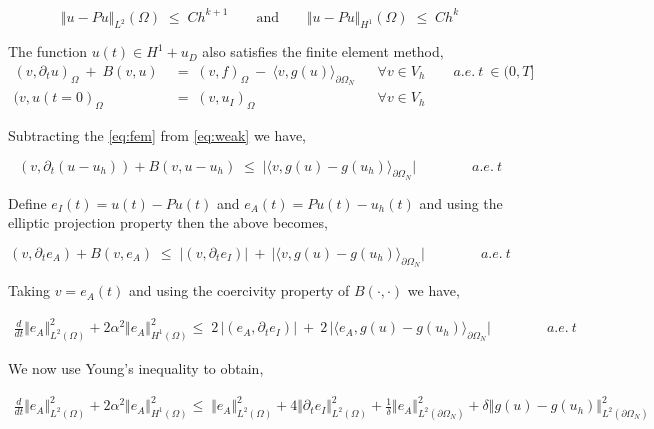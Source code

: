 \documentclass[10pt]{report}
\numberwithin{equation}{section}
\begin{document}
\begin{equation}
\Vert u - Pu \Vert_{L^{2}}(\Omega) \; \leq \; Ch^{k+1}  \qquad \text{and} \qquad 
\Vert u - Pu \Vert_{H^{1}}(\Omega) \; \leq \; Ch^{k} \label{eq:ApproxProp}
\end{equation}



The function $u(t) \in H^{1} + u_{D}$ also satisfies the finite element method, 
\begin{align}
(v,\partial_{t} u)_{\Omega} \ + \ B(v,u) \; &= \; (v,f)_{\Omega} \ - \ \langle v, g(u) \rangle_{\partial \Omega_{N}} && \forall v \in V_{h} \qquad a.e. \ t \ \in (0,T] \label{eq:weak} \\
(v,u(t=0)_{\Omega} \; &= \; (v,u_{I})_{\Omega} && \forall v \in V_{h} \label{eq:weak_init}
\end{align}



Subtracting the \eqref{eq:fem} from \eqref{eq:weak} we have,

\begin{equation}
(v,\partial_{t} (u - u_{h})) + B(v,u-u_{h}) \; \leq \; \vert \langle v, g(u) -g(u_{h}) \rangle_{\partial \Omega_{N}} \vert \qquad \qquad a.e. \ t
\end{equation} 



Define $e_{I}(t) = u(t) - Pu(t)$ and $e_{A}(t) = Pu(t) - u_{h}(t)$ and using the elliptic projection property then the above becomes,

\begin{equation}
(v,\partial_{t} e_{A}) + B(v, e_{A}) \; \leq \; \vert (v,\partial_{t} e_{I}) \vert \ + \ \vert \langle v, g(u) -g(u_{h}) \rangle_{\partial \Omega_{N}} \vert \qquad \qquad a.e. \ t
\end{equation} 


Taking $v = e_{A}(t)$ and using the coercivity property of $B(\cdot, \cdot)$ we have,

\begin{align}
\frac{d}{dt} \Vert e_{A} \Vert^{2}_{L^{2}(\Omega)}  +  2\alpha^{2} \Vert e_{A} \Vert_{H^{1}(\Omega)}^{2}  \leq \;  2 \, \vert (e_{A},\partial_{t} e_{I}) \vert \ + \ 2 \, \vert \langle e_{A}, g(u) -g(u_{h}) \rangle_{\partial \Omega_{N}} \vert \qquad \qquad a.e. \ t
\end{align} 


We now use Young's inequality to obtain,

\begin{align}
\frac{d}{dt} \Vert e_{A} \Vert^{2}_{L^{2}(\Omega)}  +  2\alpha^{2} \Vert e_{A} \Vert_{H^{1}(\Omega)}^{2}  \leq \; \Vert  e_{A} \Vert_{L^{2}(\Omega)}^{2} + 4 \Vert \partial_{t} e_{I} \Vert^{2}_{L^{2}(\Omega)} + \frac{1}{\delta} \Vert  e_{A} \Vert_{L^{2}(\partial \Omega_{N})}^{2} + \delta \Vert g(u) -g(u_{h}) \Vert_{L^{2}(\partial \Omega_{N})}^{2}
\end{align} 
\end{document}
